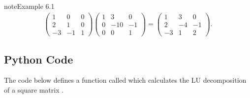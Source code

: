 \documentclass[letterpaper,10pt,english]{jupyterBook}
\begin{document}
\begin{sphinxadmonition}{note}{Example 6.1}
\begin{align*}
    \begin{pmatrix}
        1 & 0 & 0\\
        2 & 1 & 0\\
        -3 & -1 & 1
    \end{pmatrix}
    \begin{pmatrix}
        1 & 3 & 0\\
        0 & -10 & -1\\
        0 & 0 & 1
    \end{pmatrix}=
    \begin{pmatrix}
        1 & 3 & 0\\
        2 & -4 & -1\\
        -3 & 1 & 2
    \end{pmatrix}.
\end{align*}\end{sphinxadmonition}


\subsection{Python Code}
\label{\detokenize{6_Direct_methods/6.1_LU_decomposition:python-code}}
\sphinxAtStartPar
The code below defines a function called  which calculates the LU decomposition of a square matrix .
\end{document}
